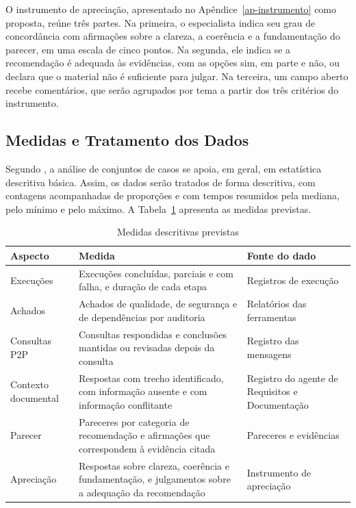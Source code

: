 O instrumento de apreciação, apresentado no Apêndice~\ref{ap-instrumento} como proposta, reúne três partes. Na primeira, o especialista indica seu grau de concordância com afirmações sobre a clareza, a coerência e a fundamentação do parecer, em uma escala de cinco pontos. Na segunda, ele indica se a recomendação é adequada às evidências, com as opções sim, em parte e não, ou declara que o material não é suficiente para julgar. Na terceira, um campo aberto recebe comentários, que serão agrupados por tema a partir dos três critérios do instrumento.

\subsection{Medidas e Tratamento dos Dados}
\label{met-tratamento}

Segundo , a análise de conjuntos de casos se apoia, em geral, em estatística descritiva básica. Assim, os dados serão tratados de forma descritiva, com contagens acompanhadas de proporções e com tempos resumidos pela mediana, pelo mínimo e pelo máximo. A Tabela~\ref{tab-medidas} apresenta as medidas previstas.

\begin{table}[htbp]
\centering
\caption{Medidas descritivas previstas}
\label{tab-medidas}
\begingroup
\footnotesize
\SingleSpacing
\setlength{\tabcolsep}{4pt}
\renewcommand{\arraystretch}{1.15}
\begin{tabularx}{\textwidth}{>{\raggedright\arraybackslash}p{3.0cm}>{\raggedright\arraybackslash}X>{\raggedright\arraybackslash}p{3.2cm}}
\hline
\textbf{Aspecto} & \textbf{Medida} & \textbf{Fonte do dado} \\ \hline
Execuções & Execuções concluídas, parciais e com falha, e duração de cada etapa & Registros de execução \\ \hline
Achados & Achados de qualidade, de segurança e de dependências por auditoria & Relatórios das ferramentas \\ \hline
Consultas P2P & Consultas respondidas e conclusões mantidas ou revisadas depois da consulta & Registro das mensagens \\ \hline
Contexto documental & Respostas com trecho identificado, com informação ausente e com informação conflitante & Registro do agente de Requisitos e Documentação \\ \hline
Parecer & Pareceres por categoria de recomendação e afirmações que correspondem à evidência citada & Pareceres e evidências \\ \hline
Apreciação & Respostas sobre clareza, coerência e fundamentação, e julgamentos sobre a adequação da recomendação & Instrumento de apreciação \\ \hline
\end{tabularx}
\endgroup
{}
\end{table}

